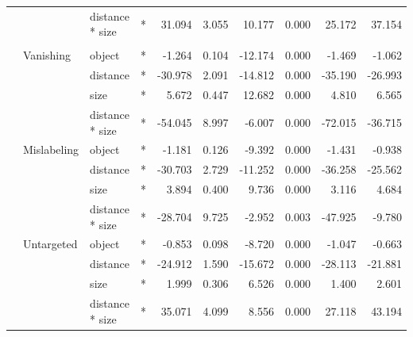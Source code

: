 \documentclass[
]{article}
\begin{document}
\begin{longtable}[t]{llllrrrrrr}
\cmidrule{3-10}\nopagebreak
\hspace{1em} &  & distance * size & * & 31.094 & 3.055 & 10.177 & 0.000 & 25.172 & 37.154\\
\cmidrule{1-10}\pagebreak[0]
\addlinespace[0.3em]
\multicolumn{10}{l}{\textbf{Cascade R-CNN}}\\
\hspace{1em} & Vanishing & object & * & -1.264 & 0.104 & -12.174 & 0.000 & -1.469 & -1.062\\
\cmidrule{3-10}\nopagebreak
\hspace{1em} &  & distance & * & -30.978 & 2.091 & -14.812 & 0.000 & -35.190 & -26.993\\
\cmidrule{3-10}\nopagebreak
\hspace{1em} &  & size & * & 5.672 & 0.447 & 12.682 & 0.000 & 4.810 & 6.565\\
\cmidrule{3-10}\nopagebreak
\hspace{1em} &  & distance * size & * & -54.045 & 8.997 & -6.007 & 0.000 & -72.015 & -36.715\\
\cmidrule{2-10}\nopagebreak
\hspace{1em} & Mislabeling & object & * & -1.181 & 0.126 & -9.392 & 0.000 & -1.431 & -0.938\\
\cmidrule{3-10}\nopagebreak
\hspace{1em} &  & distance & * & -30.703 & 2.729 & -11.252 & 0.000 & -36.258 & -25.562\\
\cmidrule{3-10}\nopagebreak
\hspace{1em} &  & size & * & 3.894 & 0.400 & 9.736 & 0.000 & 3.116 & 4.684\\
\cmidrule{3-10}\nopagebreak
\hspace{1em} &  & distance * size & * & -28.704 & 9.725 & -2.952 & 0.003 & -47.925 & -9.780\\
\cmidrule{2-10}\nopagebreak
\hspace{1em} & Untargeted & object & * & -0.853 & 0.098 & -8.720 & 0.000 & -1.047 & -0.663\\
\cmidrule{3-10}\nopagebreak
\hspace{1em} &  & distance & * & -24.912 & 1.590 & -15.672 & 0.000 & -28.113 & -21.881\\
\cmidrule{3-10}\nopagebreak
\hspace{1em} &  & size & * & 1.999 & 0.306 & 6.526 & 0.000 & 1.400 & 2.601\\
\cmidrule{3-10}\nopagebreak
\hspace{1em} &  & distance * size & * & 35.071 & 4.099 & 8.556 & 0.000 & 27.118 & 43.194\\
\bottomrule
\end{longtable}
\endgroup{}
\end{document}
